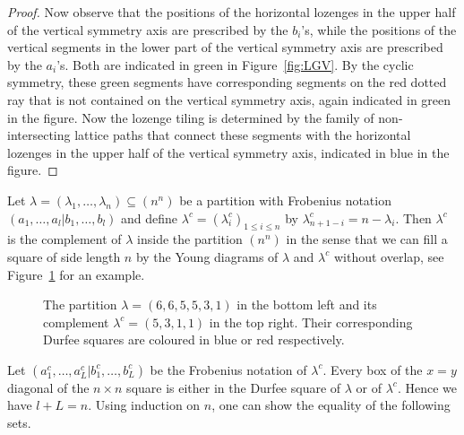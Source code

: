 \documentclass[11pt]{article}
\theoremstyle{definition}
\numberwithin{equation}{section}
\newcommand{\x}{\mathbf{x}}
\newcommand{\la}{\lambda}
\newcounter{x}
\newcounter{y}
\newcounter{z}
\begin{document}
\begin{proof}
\noindent
Now observe that the positions of the horizontal lozenges in the upper half of the vertical symmetry axis are prescribed by the $b_i$'s, while the positions of the vertical segments in the lower part of the vertical symmetry axis are prescribed by the $a_i$'s. Both are indicated in green in Figure~\ref{fig:LGV}. By the cyclic symmetry, these green segments have corresponding segments on the red dotted ray that is not contained on the vertical symmetry axis, again indicated in green in the figure. Now the lozenge tiling is determined by the family of non-intersecting lattice paths that connect these segments with the horizontal lozenges in the upper half of the vertical symmetry axis, indicated in blue in the figure.
\end{proof}

Let $\lambda=(\lambda_1,\ldots,\lambda_n)  \subseteq (n^n)$ be a partition with Frobenius notation $(a_1,\ldots,a_l | \allowbreak b_1,\ldots,b_l)$ and define $\lambda^c=(\lambda_i^c)_{1 \leq i \leq n}$ by $\lambda_{n+1-i}^c=n-\lambda_i$. Then $\lambda^c$ is the complement of $\lambda$ inside the partition $(n^n)$ in the sense that we can fill a square of side length $n$ by the Young diagrams of $\la$ and $\lambda^c$ without overlap, see Figure~\ref{fig: ex complement of partition} for an example.
\begin{figure}
\begin{center}
\caption{\label{fig: ex complement of partition} The partition $\lambda=(6,6,5,5,3,1)$ in the bottom left and its complement $\lambda^c = (5,3,1,1)$ in the top right. Their corresponding Durfee squares are coloured in blue or red respectively.}
\end{center}
\end{figure}
  Let $( a_1^c,\ldots,a_L^c|b_1^c,\ldots,b_L^c)$ be the Frobenius notation of $\lambda^c$. Every box of the $x=y$ diagonal of the $n \times n$ square is either in the Durfee square of $\lambda$ or of $ \lambda^c$. Hence we have $l+L=n$. Using induction on $n$, one can show the equality of the following sets.
\end{document}
